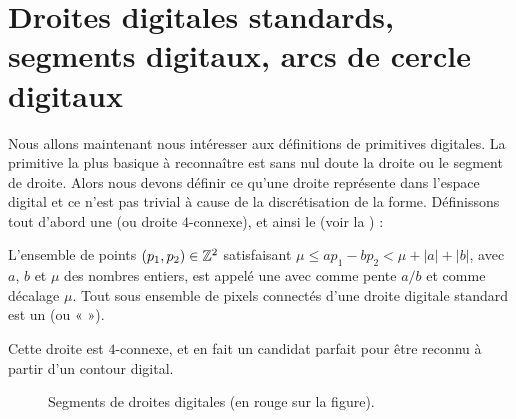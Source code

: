 \section{Droites digitales standards, segments digitaux, arcs de cercle digitaux}%
\label{sec:segments}
%
Nous allons maintenant nous intéresser aux définitions de primitives digitales.
La primitive la plus basique à reconnaître est sans nul doute la droite ou le
segment de droite. Alors nous devons définir ce qu'une droite représente dans
l'espace digital et ce n'est pas trivial à cause de la discrétisation de la
forme. Définissons tout d'abord une  (ou
droite $4$-connexe), et ainsi le  (voir la
) :
%
\begin{definition}{}
  \label{def:DSS}
%
  L'ensemble de points $(p_1,p_2) \in \mathbb{Z}^2$ satisfaisant $\mu \le ap_1 - bp_2 <
  \mu + |a| + |b|$, avec $a$, $b$ et $\mu$ des nombres entiers, est appelé une
   avec comme pente $a/b$ et comme décalage
  $\mu$. Tout sous ensemble de pixels connectés d'une droite digitale standard
  est un  (ou «  »).
%
\end{definition}
%
Cette droite est $4$-connexe, et en fait un candidat parfait pour être reconnu à
partir d'un contour digital.

\begin{figure}[ht]{
    \begin{center}
    
    \end{center}}
    \caption{Segments de droites digitales (en rouge sur la figure).\label{fig:dss-figure}}
\end{figure}



